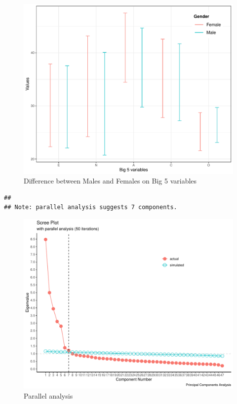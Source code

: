 \documentclass[
  english,
  man, fleqn, noextraspace]{apa6}
\begin{document}
\begin{figure}
\centering
\includegraphics{final_project_files/figure-latex/errorbars-1.pdf}
\caption{\label{fig:errorbars}Difference between Males and Females on Big 5 variables}
\end{figure}

\begin{verbatim}
## 
## Note: parallel analysis suggests 7 components.
\end{verbatim}

\begin{figure}
\centering
\includegraphics{final_project_files/figure-latex/parallel-analysis-1.pdf}
\caption{\label{fig:parallel-analysis}Parallel analysis}
\end{figure}
\end{document}
